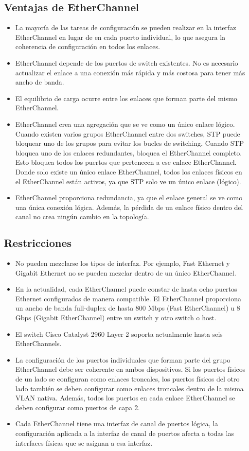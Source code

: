 \documentclass[
	12pt, %
	fleqn, %
	a4paper, %
	oneside, %
]{LegrandOrangeBook}
\begin{document}
\subsection{Ventajas de EtherChannel}
\begin{itemize}
\item La mayoría de las tareas de configuración se pueden realizar en la interfaz EtherChannel en lugar  de en cada puerto individual, lo que asegura la coherencia de configuración en todos los enlaces.
\item EtherChannel depende de los puertos de switch existentes. No es necesario actualizar el enlace a  una conexión más rápida y más costosa para tener más ancho de banda.
\item El equilibrio de carga ocurre entre los enlaces que forman parte del mismo EtherChannel.
\item EtherChannel crea una agregación que se ve como un único enlace lógico. Cuando existen varios  grupos EtherChannel entre dos switches, STP puede bloquear uno de los grupos para evitar los  bucles de switching. Cuando STP bloquea uno de los enlaces redundantes, bloquea el  EtherChannel completo. Esto bloquea todos los puertos que pertenecen a ese enlace  EtherChannel. Donde solo existe un único enlace EtherChannel, todos los enlaces físicos en el  EtherChannel están activos, ya que STP solo ve un único enlace (lógico).
\item EtherChannel proporciona redundancia, ya que el enlace general se ve como una única conexión  lógica. Además, la pérdida de un enlace físico dentro del canal no crea ningún cambio en la  topología.
\end{itemize}
\subsection{Restricciones}
\begin{itemize}
\item No pueden mezclarse los tipos de interfaz. Por ejemplo, Fast Ethernet y Gigabit Ethernet no se pueden mezclar dentro de un único EtherChannel.
\item En la actualidad, cada EtherChannel puede constar de hasta ocho puertos Ethernet configurados  de manera compatible. El EtherChannel proporciona un ancho de banda full-duplex de hasta 800  Mbps (Fast EtherChannel) u 8 Gbps (Gigabit EtherChannel) entre un switch y otro switch o host.
\item El switch Cisco Catalyst 2960 Layer 2 soporta actualmente hasta seis EtherChannels.
\item La configuración de los puertos individuales que forman parte del grupo EtherChannel debe ser  coherente en ambos dispositivos. Si los puertos físicos de un lado se configuran como enlaces  troncales, los puertos físicos del otro lado también se deben configurar como enlaces troncales  dentro de la misma VLAN nativa. Además, todos los puertos en cada enlace EtherChannel se  deben configurar como puertos de capa 2.
\item Cada EtherChannel tiene una interfaz de canal de puertos lógica, la configuración aplicada a la  interfaz de canal de puertos afecta a todas las interfaces físicas que se asignan a esa interfaz.
\end{itemize}
\end{document}
